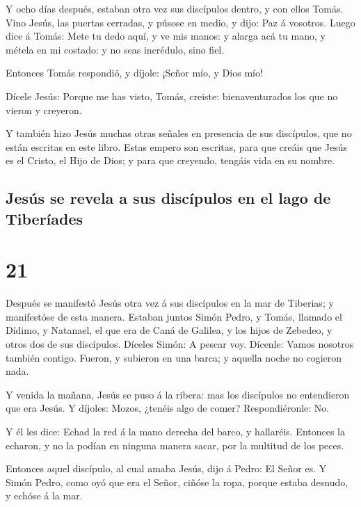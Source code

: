  Y ocho días después, estaban otra vez sus discípulos
dentro, y con ellos Tomás. Vino Jesús, las puertas cerradas, y púsose en
medio, y dijo: Paz á vosotros.  Luego dice á Tomás: Mete
tu dedo aquí, y ve mis manos: y alarga acá tu mano, y métela en mi
costado: y no seas incrédulo, sino fiel.

 Entonces Tomás respondió, y díjole: ¡Señor mío, y Dios
mío!

 Dícele Jesús: Porque me has visto, Tomás, creiste:
bienaventurados los que no vieron y creyeron.

 Y también hizo Jesús muchas otras señales en presencia
de sus discípulos, que no están escritas en este libro. 
Estas empero son escritas, para que creáis que Jesús es el Cristo, el
Hijo de Dios; y para que creyendo, tengáis vida en su nombre.

\hypertarget{jesuxfas-se-revela-a-sus-discuxedpulos-en-el-lago-de-tiberuxedades}{%
\subsection{Jesús se revela a sus discípulos en el lago de
Tiberíades}\label{jesuxfas-se-revela-a-sus-discuxedpulos-en-el-lago-de-tiberuxedades}}

\hypertarget{section-20}{%
\section{21}\label{section-20}}

 Después se manifestó Jesús otra vez á sus discípulos en
la mar de Tiberias; y manifestóse de esta manera.  Estaban
juntos Simón Pedro, y Tomás, llamado el Dídimo, y Natanael, el que era
de Caná de Galilea, y los hijos de Zebedeo, y otros dos de sus
discípulos.  Díceles Simón: A pescar voy. Dícenle: Vamos
nosotros también contigo. Fueron, y subieron en una barca; y aquella
noche no cogieron nada.

 Y venida la mañana, Jesús se puso á la ribera: mas los
discípulos no entendieron que era Jesús.  Y díjoles:
Mozos, ¿tenéis algo de comer? Respondiéronle: No.

 Y él les dice: Echad la red á la mano derecha del barco,
y hallaréis. Entonces la echaron, y no la podían en ninguna manera
sacar, por la multitud de los peces.

 Entonces aquel discípulo, al cual amaba Jesús, dijo á
Pedro: El Señor es. Y Simón Pedro, como oyó que era el Señor, ciñóse la
ropa, porque estaba desnudo, y echóse á la mar.

